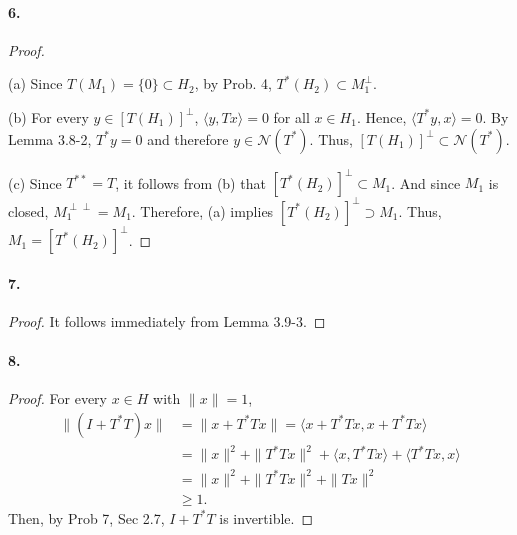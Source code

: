   \paragraph{6.}
  \begin{proof}
    $\,$\par
    (a) Since $T(M_1)=\{0\}\subset H_2$, by Prob. 4, $T^*(H_2)\subset 
    M_1^\perp$.\par
    (b) For every $y\in[T(H_1)]^\perp$, $\langle y,Tx\rangle=0$ for all $x\in
    H_1$. Hence, $\langle T^*y, x\rangle=0$. By Lemma 3.8-2, $T^*y=0$ and 
    therefore $y\in\mathcal{N}(T^*)$. Thus, $[T(H_1)]^\perp\subset\mathcal{N}
    (T^*)$.\par
    (c) Since $T^{**}=T$, it follows from (b) that $[T^*(H_2)]^\perp\subset 
    M_1$. And since $M_1$ is closed, $M_1^{\perp\perp}=M_1$. Therefore, (a) 
    implies $[T^*(H_2)]^\perp\supset M_1$. Thus, $M_1=[T^*(H_2)]^\perp$.
  \end{proof}
  
  \paragraph{7.}
  \begin{proof}
    It follows immediately from Lemma 3.9-3. 
  \end{proof}
  
  \paragraph{8.}
  \begin{proof}
    For every $x\in H$ with $\|x\|=1$,
    \begin{align*}
      \|(I+T^*T)x\|
      &=\|x+T^*Tx\|=\langle x+T^*Tx,x+T^*Tx\rangle\\
      &=\|x\|^2+\|T^*Tx\|^2+\langle x,T^*Tx\rangle+\langle T^*Tx,x\rangle\\
      &=\|x\|^2+\|T^*Tx\|^2+\|Tx\|^2 \\
      &\ge 1.
    \end{align*}
    Then, by Prob 7, Sec 2.7, $I+T^*T$ is invertible.
  \end{proof}
  
